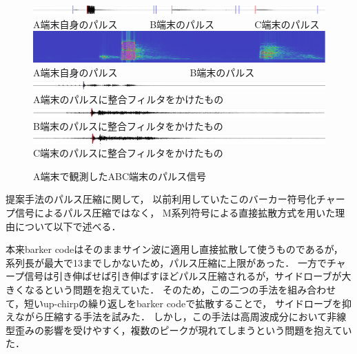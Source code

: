 \begin{figure}[p]\centering
\vspace{2mm}
\begin{small}
\includegraphics[clip,width=1.0\hsize]{img/rawdata.png}\\
A端末自身のパルス~ ~ ~ ~
B端末のパルス~ ~ ~ ~ ~
C端末のパルス\\\vspace{0.5mm}
\includegraphics[clip,width=0.8\hsize]{img/spectrogram.png}\hspace{1cm}\\
A端末自身のパルス~ ~ ~ ~ ~ ~ ~ ~ ~
B端末のパルス\\\vspace{0.5mm}
\includegraphics[clip,width=1.0\hsize]{img/corrA.png}\\
A端末のパルスに整合フィルタをかけたもの\\\vspace{0.5mm}
\includegraphics[clip,width=1.0\hsize]{img/corrB.png}\\
B端末のパルスに整合フィルタをかけたもの\\\vspace{0.5mm}
\includegraphics[clip,width=1.0\hsize]{img/corrC.png}\\
C端末のパルスに整合フィルタをかけたもの\\
\vspace{1mm}
\caption{A端末で観測したABC端末のパルス信号}\label{fig:corr}

\end{small}
\vspace{1mm}
\end{figure}

提案手法のパルス圧縮に関して，
以前利用していたこのバーカー符号化チャープ信号によるパルス圧縮ではなく，
M系列符号による直接拡散方式を用いた理由について以下で述べる．

本来barker codeはそのままサイン波に適用し直接拡散して使うものであるが，
系列長が最大で13までしかないため，パルス圧縮に上限があった．
一方でチャープ信号は引き伸ばせば引き伸ばすほどパルス圧縮されるが，サイドローブが大きくなるという問題を抱えていた．
そのため，この二つの手法を組み合わせて，短いup-chirpの繰り返しをbarker codeで拡散することで，
サイドローブを抑えながら圧縮する手法を試みた．
しかし，この手法は高周波成分において非線型歪みの影響を受けやすく，複数のピークが現れてしまうという問題を抱えていた．

